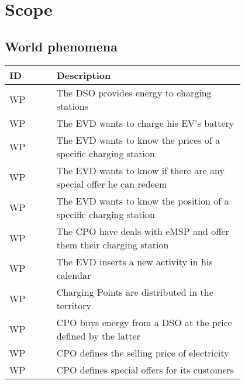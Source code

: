 \newpage


\section{Scope}
\label{sec:scope}
\setcounter{wp}{1}
\newcommand{\cwp}{\thewp\stepcounter{wp}}

\subsection{World phenomena}
\begin{table}[H]
    \begin{center}
        \begin{longtable}{ |l|p{0.8\linewidth}| }
            \hline
            \textbf{ID} & \textbf{Description}                                               \\
            \hline
            WP\cwp      & The DSO provides energy to charging stations                       \\
            \hline
            WP\cwp      & The EVD wants to charge his EV's battery                           \\
            \hline
            WP\cwp      & The EVD wants to know the prices of a specific charging station    \\
            \hline
            WP\cwp      & The EVD wants to know if there are any special offer he can redeem \\
            \hline
            WP\cwp      & The EVD wants to know the position of a specific charging station  \\
            \hline
            WP\cwp      & The CPO have deals with eMSP and offer them their charging station \\
            \hline
            WP\cwp      & The EVD inserts a new activity in his calendar                     \\
            \hline
            WP\cwp      & Charging Points are distributed in the territory                   \\
            \hline
            WP\cwp      & CPO buys energy from a DSO at the price defined by the latter      \\
            \hline
            WP\cwp      & CPO defines the selling price of electricity                       \\
            \hline
            WP\cwp      & CPO defines special offers for its customers                       \\

\end{longtable}
\end{center}
\end{table}
